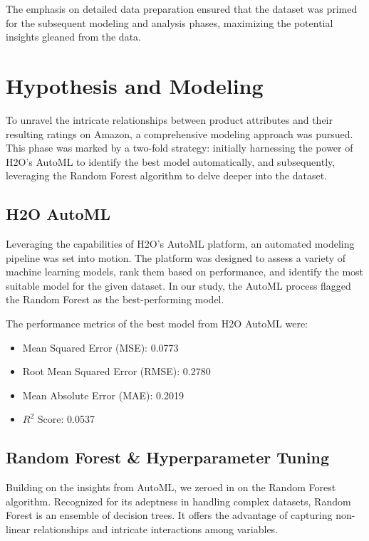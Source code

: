 \documentclass[12pt]{article}
\begin{document}
The emphasis on detailed data preparation ensured that the dataset was primed for the subsequent modeling and analysis phases, maximizing the potential insights gleaned from the data.


\section{Hypothesis and Modeling}

To unravel the intricate relationships between product attributes and their resulting ratings on Amazon, a comprehensive modeling approach was pursued. This phase was marked by a two-fold strategy: initially harnessing the power of H2O's AutoML to identify the best model automatically, and subsequently, leveraging the Random Forest algorithm to delve deeper into the dataset.

\subsection{H2O AutoML}

Leveraging the capabilities of H2O's AutoML platform, an automated modeling pipeline was set into motion. The platform was designed to assess a variety of machine learning models, rank them based on performance, and identify the most suitable model for the given dataset. In our study, the AutoML process flagged the Random Forest as the best-performing model.

The performance metrics of the best model from H2O AutoML were:
\begin{itemize}
    \item Mean Squared Error (MSE): 0.0773
    \item Root Mean Squared Error (RMSE): 0.2780
    \item Mean Absolute Error (MAE): 0.2019
    \item \( R^2 \) Score: 0.0537
\end{itemize}

\subsection{Random Forest \& Hyperparameter Tuning}

Building on the insights from AutoML, we zeroed in on the Random Forest algorithm. Recognized for its adeptness in handling complex datasets, Random Forest is an ensemble of decision trees. It offers the advantage of capturing non-linear relationships and intricate interactions among variables.
\end{document}
